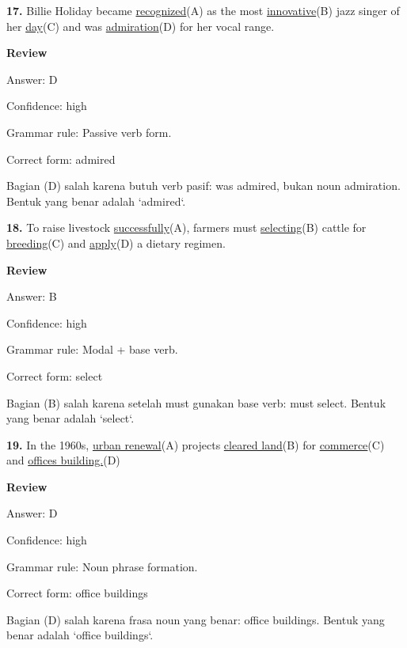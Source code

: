 \documentclass[12pt]{article}
\begin{document}
\endgroup
\par
\vspace{\questionblockgap}
\noindent\textbf{17.} Billie Holiday became \uline{recognized}(A) as the most \uline{innovative}(B) jazz singer of her \uline{day}(C) and was \uline{admiration}(D) for her vocal range.
\par
\begingroup
\setlength{\parskip}{0pt}
\setlength{\parindent}{0pt}
\textbf{Review}\par
Answer: D\par
Confidence: high\par
Grammar rule: Passive verb form.\par
Correct form: admired\par
Bagian (D) salah karena butuh verb pasif: was admired, bukan noun admiration. Bentuk yang benar adalah `admired`.\par
\endgroup
\par
\vspace{\questionblockgap}
\noindent\textbf{18.} To raise livestock \uline{successfully}(A), farmers must \uline{selecting}(B) cattle for \uline{breeding}(C) and \uline{apply}(D) a dietary regimen.
\par
\begingroup
\setlength{\parskip}{0pt}
\setlength{\parindent}{0pt}
\textbf{Review}\par
Answer: B\par
Confidence: high\par
Grammar rule: Modal + base verb.\par
Correct form: select\par
Bagian (B) salah karena setelah must gunakan base verb: must select. Bentuk yang benar adalah `select`.\par
\endgroup
\par
\vspace{\questionblockgap}
\noindent\textbf{19.} In the 1960s, \uline{urban renewal}(A) projects \uline{cleared land}(B) for \uline{commerce}(C) and \uline{offices building.}(D)
\par
\begingroup
\setlength{\parskip}{0pt}
\setlength{\parindent}{0pt}
\textbf{Review}\par
Answer: D\par
Confidence: high\par
Grammar rule: Noun phrase formation.\par
Correct form: office buildings\par
Bagian (D) salah karena frasa noun yang benar: office buildings. Bentuk yang benar adalah `office buildings`.\par
\end{document}
